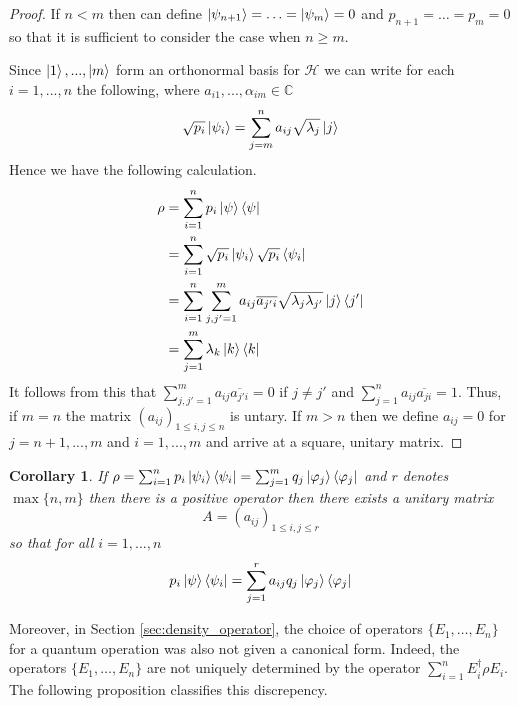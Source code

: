 \documentclass[12pt]{article}
\theoremstyle{plain}
\newtheorem{cor}[thm]{Corollary}
\theoremstyle{definition}
\newcommand{\bb}[1]{\mathbb{#1}}
\newcommand{\call}[1]{\mathcal{#1}}
\begin{document}
	\begin{proof}
		If $n < m$ then can define $\ket{\psi_{n+1}} = \hdots = \ket{\psi_{m}} = 0$ and $p_{n+1} = \hdots = p_{m} = 0$ so that it is sufficient to consider the case when $n \geq m$.
		
		Since $\ket{1},...,\ket{m}$ form an orthonormal basis for $\call{H}$ we can write for each $i = 1,...,n$ the following, where $a_{i1},...,\alpha_{im} \in \bb{C}$
		\begin{equation}\label{eq:possibly_opaque}
			\sqrt{p_i}\ket{\psi_i} = \sum_{j = m}^n a_{ij} \sqrt{\lambda_j}\ket{j}
		\end{equation}
		Hence we have the following calculation.
		\begin{align}
			\rho &= \sum_{i = 1}^n p_i \ket{\psi} \bra{\psi}\\
			&= \sum_{i = 1}^n \sqrt{p_i}\ket{\psi_i}\sqrt{p_i}\bra{\psi_i}\\
			&= \sum_{i = 1}^n\sum_{j,j'=1}^m a_{ij}\overline{a_{j'i}}\sqrt{\lambda_j \lambda_{j'}} \ket{j} \bra{j'}\\
			&= \sum_{j = 1}^m \lambda_k \ket{k}\bra{k}
		\end{align}
		It follows from this that $\sum_{j,j' = 1}^m a_{ij}\overline{a_{j'i}} = 0$ if $j \neq j'$ and $\sum_{j = 1}^n a_{ij}\overline{a_{ji}} = 1$. Thus, if $m = n$ the matrix $(a_{ij})_{1 \leq i,j \leq n}$ is untary. If $m > n$ then we define $a_{ij} = 0$ for $j = n+1,...,m$ and $i = 1,...,m$ and arrive at a square, unitary matrix.
	\end{proof}
	\begin{cor}\label{cor:equivalent_density_operators}
		If $\rho = \sum_{i = 1}^n p_i \ket{\psi_i}\bra{\psi_i} = \sum_{j = 1}^m q_j \ket{\varphi_j} \bra{\varphi_j}$ and $r$ denotes $\operatorname{max}\lbrace n, m \rbrace$ then there is a positive operator then there exists a unitary matrix 
		\begin{equation}
			A = (a_{ij})_{1 \leq i,j \leq r}
		\end{equation}
		so that for all $i = 1,...,n$
		\begin{equation}
			p_i \ket{\psi}\bra{\psi_i} = \sum_{j = 1}^{r}a_{ij}q_j \ket{\varphi_j}\bra{\varphi_j}
		\end{equation}
	\end{cor}
	Moreover, in Section \ref{sec:density_operator}, the choice of operators $\lbrace E_1,\ldots,E_n\rbrace$ for a quantum operation was also not given a canonical form. Indeed, the operators $\{ E_1, \ldots, E_n\}$ are not uniquely determined by the operator $\sum_{i = 1}^n E_i^\dagger \rho E_i$. The following proposition classifies this discrepency.
\end{document}
